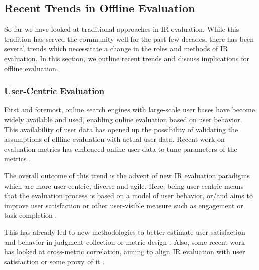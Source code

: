 \subsection{Recent Trends in Offline Evaluation}

So far we have looked at traditional approaches in IR evaluation. While this tradition has served the community well for the past few decades, there has been several trends which necessitate a change in the roles and methods of IR evaluation. In this section, we outline recent trends and discuss implications for offline evaluation.

\subsubsection{User-Centric Evaluation}
First and foremost, online search engines with large-scale user bases have become widely available and used, enabling online evaluation based on user behavior. This availability of user data has opened up the possibility of validating the assumptions of offline evaluation with actual user data. Recent work on evaluation metrics has embraced online user data to tune parameters of the metrics \citep[for example]{CarteretteKY11, Carterette:2012,smucker12stochastic,YilmazSCR10}.

The overall outcome of this trend is the advent of new IR evaluation paradigms which are more user-centric, diverse and agile. Here, being user-centric means that the evaluation process is based on a model of user behavior, or/and aims to improve user satisfaction or other user-visible measure such as engagement or task completion \citep{scholer13}. 

This has already led to new methodologies to better estimate user satisfaction and behavior in judgment collection \citep{VermaY16, VermaYC16} or metric design \citep{YilmazSCR10, CarteretteKY11, ChapelleMZG09}. Also, some recent work has looked at cross-metric correlation, aiming to align IR evaluation with user satisfaction or some proxy of it \citep{Al-Maskari2007,radl:comp10}.


